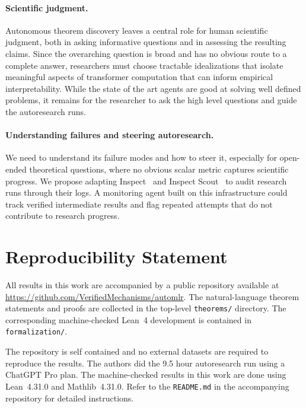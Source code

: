 \documentclass{article}
\theoremstyle{definition}
\theoremstyle{plain}
\begin{document}
\paragraph{Scientific judgment.}
Autonomous theorem discovery leaves a central role for human scientific judgment, both in asking informative questions and in assessing the resulting claims. Since the overarching question is broad and has no obvious route to a complete answer, researchers must choose tractable idealizations that isolate meaningful aspects of transformer computation that can inform empirical interpretability. While the state of the art agents are good at solving well defined problems, it remains for the researcher to ask the high level questions and guide the autoresearch runs.

\paragraph{Understanding failures and steering autoresearch.}
We need to understand its failure modes and how to steer it, especially for open-ended theoretical questions, where no obvious scalar metric captures scientific progress. We propose adapting Inspect~\citep{aisi2024inspect} and Inspect Scout~\citep{dubois2026loganalysis} to audit research runs through their logs. A monitoring agent built on this infrastructure could track verified intermediate results and flag repeated attempts that do not contribute to research progress.

\clearpage
\appendix
\section{Reproducibility Statement}
All results in this work are accompanied by a public repository available at \url{https://github.com/VerifiedMechanisms/automlr}. The natural-language theorem statements and proofs are collected in the top-level \texttt{theorems/} directory. The corresponding machine-checked Lean~4 development is contained in \texttt{formalization/}.

The repository is self contained and no external datasets are required to reproduce the results. The authors did the 9.5 hour autoresearch run using a ChatGPT Pro plan. The machine-checked results in this work are done using Lean~4.31.0 and Mathlib~4.31.0. Refer to the \texttt{README.md} in the accompanying repository for detailed instructions. 
\end{document}
